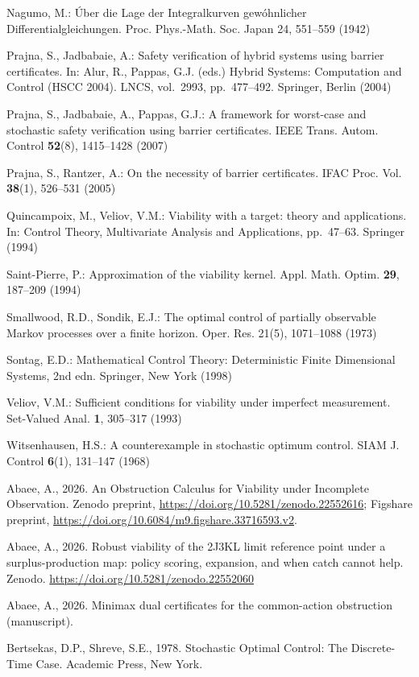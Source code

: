 \documentclass[10pt,twocolumn]{article}
\theoremstyle{definition}
\begin{document}
{Nagumo, M.: \'Uber die Lage der Integralkurven gew\'ohnlicher
Differentialgleichungen. Proc. Phys.-Math. Soc. Japan 24, 551--559
(1942)

Prajna, S., Jadbabaie, A.: Safety verification of hybrid systems using
barrier certificates. In: Alur, R., Pappas, G.J. (eds.) Hybrid Systems:
Computation and Control (HSCC 2004). LNCS, vol.~2993, pp.~477--492.
Springer, Berlin (2004)

Prajna, S., Jadbabaie, A., Pappas, G.J.: A framework for worst-case and
stochastic safety verification using barrier certificates. IEEE Trans.
Autom. Control \textbf{52}(8), 1415--1428 (2007)

Prajna, S., Rantzer, A.: On the necessity of barrier certificates. IFAC
Proc. Vol. \textbf{38}(1), 526--531 (2005)

Quincampoix, M., Veliov, V.M.: Viability with a target: theory and
applications. In: Control Theory, Multivariate Analysis and
Applications, pp.~47--63. Springer (1994)

Saint-Pierre, P.: Approximation of the viability kernel. Appl. Math.
Optim. \textbf{29}, 187--209 (1994)

Smallwood, R.D., Sondik, E.J.: The optimal control of partially
observable Markov processes over a finite horizon. Oper. Res. 21(5),
1071--1088 (1973)

Sontag, E.D.: Mathematical Control Theory: Deterministic Finite Dimensional Systems, 2nd edn. Springer, New York (1998)

Veliov, V.M.: Sufficient conditions for viability under imperfect
measurement. Set-Valued Anal. \textbf{1}, 305--317 (1993)

Witsenhausen, H.S.: A counterexample in stochastic optimum control.
SIAM J. Control \textbf{6}(1), 131--147 (1968)

Abaee, A., 2026. An Obstruction Calculus for Viability under Incomplete Observation. Zenodo preprint, \url{https://doi.org/10.5281/zenodo.22552616}; Figshare preprint, \url{https://doi.org/10.6084/m9.figshare.33716593.v2}.

Abaee, A., 2026. Robust viability of the 2J3KL limit reference point
under a surplus-production map: policy scoring, expansion, and when
catch cannot help. Zenodo.
\url{https://doi.org/10.5281/zenodo.22552060}

Abaee, A., 2026. Minimax dual certificates for the common-action
obstruction (manuscript).

Bertsekas, D.P., Shreve, S.E., 1978. Stochastic Optimal Control: The
Discrete-Time Case. Academic Press, New York.

}
\end{document}
